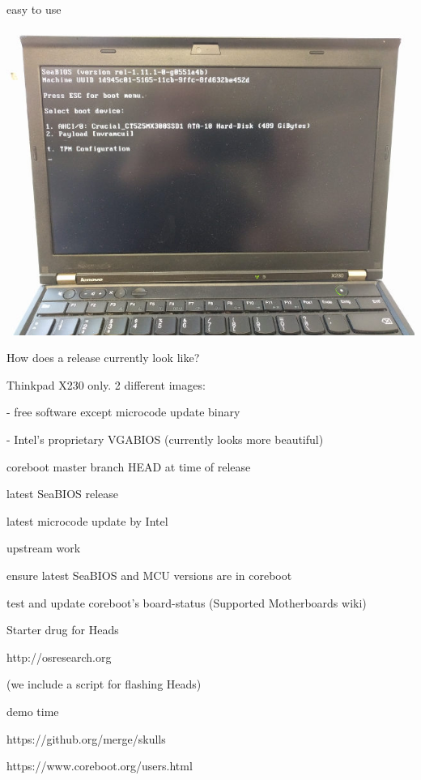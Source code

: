 \documentclass[14pt]{beamer}
\begin{document}
\begin{frame}
easy to use
\end{frame}


\begin{frame}

\includegraphics[width=\textwidth]{seabios}

\end{frame}


\begin{frame}
How does a release currently look like?
\end{frame}


\begin{frame}
Thinkpad X230 only. 2 different images:

- free software except microcode update binary

- Intel's proprietary VGABIOS (currently looks more beautiful)
\pause

coreboot master branch HEAD at time of release

latest SeaBIOS release

latest microcode update by Intel
\end{frame}


\begin{frame}
upstream work
\end{frame}


\begin{frame}
ensure latest SeaBIOS and MCU versions are in coreboot


test and update coreboot's board-status (Supported Motherboards wiki)
\end{frame}


\begin{frame}
Starter drug for Heads
\end{frame}


\begin{frame}
http://osresearch.org

(we include a script for flashing Heads)
\end{frame}

\begin{frame}
demo time
\end{frame}

\begin{frame}
https://github.org/merge/skulls

https://www.coreboot.org/users.html
\end{frame}
\end{document}
